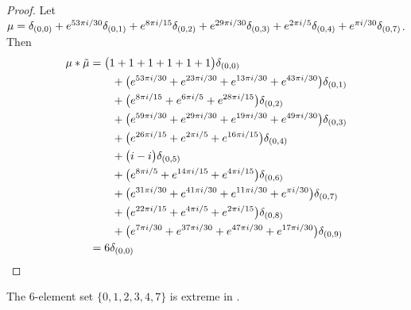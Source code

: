 \begin{proof}
Let  $\mu =  \delta_{(0,0)}+e^{53\pi i/30}\delta_{(0,1)}+e^{8\pi i/15}\delta_{(0,2)}+e^{29\pi i/30}\delta_{(0,3)}+e^{2\pi i/5}\delta_{(0,4)}+e^{\pi i/30}\delta_{(0,7)}
$.  Then 
\begin{align*} 
\mu * \tilde \mu & = \big(1+1+1+1+1+1\big)\delta_{(0,0)}
\\&\qquad
+\big(e^{53\pi i/30}+e^{23\pi i/30}+e^{13\pi i/30}+e^{43\pi i/30}\big)\delta_{(0,1)}
\\&\qquad
+\big(e^{8\pi i/15}+e^{6\pi i/5}+e^{28\pi i/15}\big)\delta_{(0,2)}
\\&\qquad
+\big(e^{59\pi i/30}+e^{29\pi i/30}+e^{19\pi i/30}+e^{49\pi i/30}\big)\delta_{(0,3)}
\\&\qquad
+\big(e^{26\pi i/15}+e^{2\pi i/5}+e^{16\pi i/15}\big)\delta_{(0,4)}
\\&\qquad
+\big(i-i\big)\delta_{(0,5)}
\\&\qquad
+\big(e^{8\pi i/5}+e^{14\pi i/15}+e^{4\pi i/15}\big)\delta_{(0,6)}
\\&\qquad
+\big(e^{31\pi i/30}+e^{41\pi i/30}+e^{11\pi i/30}+e^{\pi i/30}\big)\delta_{(0,7)}
\\&\qquad
+\big(e^{22\pi i/15}+e^{4\pi i/5}+e^{2\pi i/15}\big)\delta_{(0,8)}
\\&\qquad
+\big(e^{7\pi i/30}+e^{37\pi i/30}+e^{47\pi i/30}+e^{17\pi i/30}\big)\delta_{(0,9)}\\&=6\delta_{(0 , 0)}\qedhere
\end{align*}
\end{proof}


\begin{prop}\label{prop6in10} The 6-element set
$\{0,1,2,3,4,7\} $ is extreme in  .
\end{prop}

